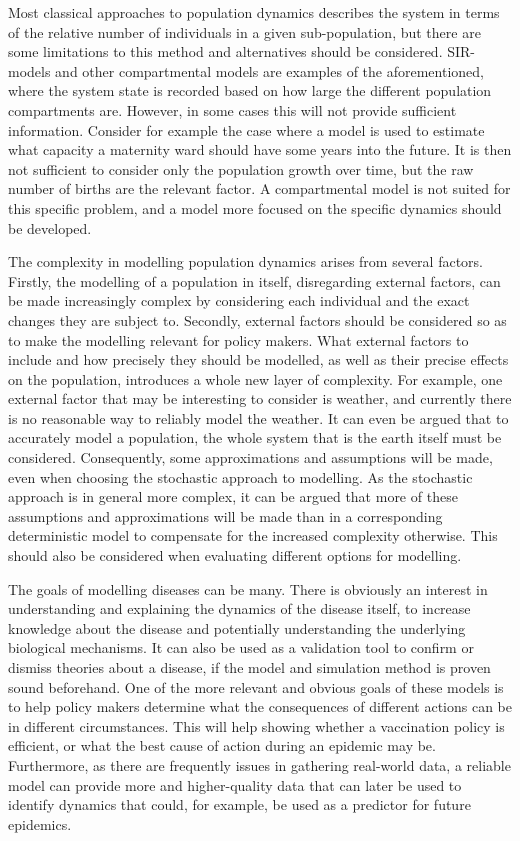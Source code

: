 \documentclass[10pt,a4paper]{article}
\begin{document}
Most classical approaches to population dynamics describes the system in terms of the relative number of individuals in a given sub-population, but there are some limitations to this method and alternatives should be considered. SIR-models and other compartmental models are examples of the aforementioned, where the system state is recorded based on how large the different population compartments are. However, in some cases this will not provide sufficient information. Consider for example the case where a model is used to estimate what capacity a maternity ward should have some years into the future. It is then not sufficient to consider only the population growth over time, but the raw number of births are the relevant factor. A compartmental model is not suited for this specific problem, and a model more focused on the specific dynamics should be developed.

The complexity in modelling population dynamics arises from several factors. Firstly, the modelling of a population in itself, disregarding external factors, can be made increasingly complex by considering each individual and the exact changes they are subject to. Secondly, external factors should be considered so as to make the modelling relevant for policy makers. What external factors to include and how precisely they should be modelled, as well as their precise effects on the population, introduces a whole new layer of complexity. For example, one external factor that may be interesting to consider is weather, and currently there is no reasonable way to reliably model the weather. It can even be argued that to accurately model a population, the whole system that is the earth itself must be considered. Consequently, some approximations and assumptions will be made, even when choosing the stochastic approach to modelling. As the stochastic approach is in general more complex, it can be argued that more of these assumptions and approximations will be made than in a corresponding deterministic model to compensate for the increased complexity otherwise. This should also be considered when evaluating different options for modelling.

The goals of modelling diseases can be many. There is obviously an interest in understanding and explaining the dynamics of the disease itself, to increase knowledge about the disease and potentially understanding the underlying biological mechanisms. It can also be used as a validation tool to confirm or dismiss theories about a disease, if the model and simulation method is proven sound beforehand. One of the more relevant and obvious goals of these models is to help policy makers determine what the consequences of different actions can be in different circumstances. This will help showing whether a vaccination policy is efficient, or what the best cause of action during an epidemic may be. Furthermore, as there are frequently issues in gathering real-world data, a reliable model can provide more and higher-quality data that can later be used to identify dynamics that could, for example, be used as a predictor for future epidemics.
\end{document}
